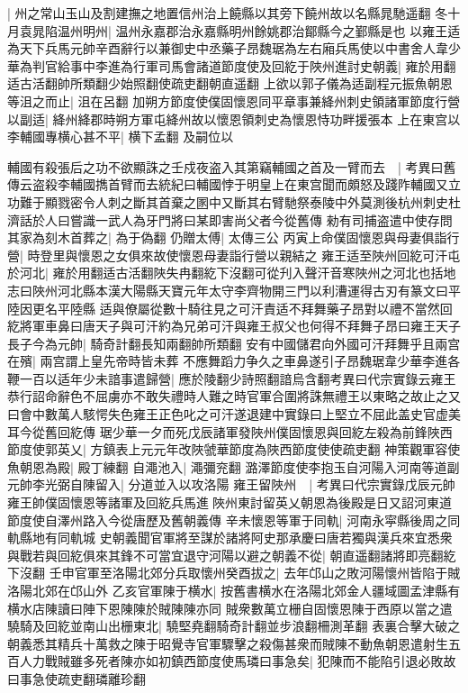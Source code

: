|{
	州之常山玉山及割建撫之地置信州治上饒縣以其旁下饒州故以名縣晁馳遥翻}
冬十月袁晁陷温州明州|{
	温州永嘉郡治永嘉縣明州餘姚郡治鄮縣今之鄞縣是也}
以雍王适為天下兵馬元帥辛酉辭行以兼御史中丞藥子昂魏琚為左右廂兵馬使以中書舍人韋少華為判官給事中李進為行軍司馬會諸道節度使及回紇于陜州進討史朝義|{
	雍於用翻适古活翻帥所類翻少始照翻使疏吏翻朝直遥翻}
上欲以郭子儀為适副程元振魚朝恩等沮之而止|{
	沮在呂翻}
加朔方節度使僕固懷恩同平章事兼絳州刺史領諸軍節度行營以副适|{
	絳州絳郡時朔方軍屯絳州故以懷恩領刺史為懷恩恃功畔援張本}
上在東宫以李輔國專横心甚不平|{
	横下孟翻}
及嗣位以

輔國有殺張后之功不欲顯誅之壬戍夜盗入其第竊輔國之首及一臂而去　|{
	考異曰舊傳云盗殺李輔國擕首臂而去統紀曰輔國悖于明皇上在東宫聞而頗怒及踐阼輔國又立功難于顯戮密令人刺之斷其首棄之圂中又斷其右臂馳祭泰陵中外莫測後杭州刺史杜濟話於人曰嘗識一武人為牙門將曰某即害尚父者今從舊傳}
勑有司捕盗遣中使存問其家為刻木首葬之|{
	為于偽翻}
仍贈太傅|{
	太傳三公}
丙寅上命僕固懷恩與母妻俱詣行營|{
	時登里與懷恩之女俱來故使懷恩母妻詣行營以親結之}
雍王适至陜州回紇可汗屯於河北|{
	雍於用翻适古活翻陜失冉翻紇下沒翻可從刋入聲汗音寒陜州之河北也括地志曰陜州河北縣本漢大陽縣天寶元年太守李齊物開三門以利漕運得古刃有篆文曰平陸因更名平陸縣}
适與僚屬從數十騎往見之可汗責适不拜舞藥子昂對以禮不當然回紇將軍車鼻曰唐天子與可汗約為兄弟可汗與雍王叔父也何得不拜舞子昂曰雍王天子長子今為元帥|{
	騎奇計翻長知兩翻帥所類翻}
安有中國儲君向外國可汗拜舞乎且兩宫在殯|{
	兩宫謂上皇先帝時皆未葬}
不應舞蹈力争久之車鼻遂引子昂魏琚韋少華李進各鞭一百以适年少未諳事遣歸營|{
	應於陵翻少詩照翻諳烏含翻考異曰代宗實錄云雍王恭行詔命辭色不屈虜亦不敢失禮時人難之時官軍合圍將誅無禮王以東略之故止之又曰會中數萬人駭愕失色雍王正色叱之可汗遂退建中實錄曰上堅立不屈此盖史官虚美耳今從舊回紇傳}
琚少華一夕而死戊辰諸軍發陜州僕固懷恩與回紇左殺為前鋒陜西節度使郭英乂|{
	方鎮表上元元年改陜虢華節度為陜西節度使使疏吏翻}
神策觀軍容使魚朝恩為殿|{
	殿丁練翻}
自澠池入|{
	澠彌兖翻}
潞澤節度使李抱玉自河陽入河南等道副元帥李光弼自陳留入|{
	分道並入以攻洛陽}
雍王留陜州　|{
	考異曰代宗實錄戊辰元帥雍王帥僕固懷恩等諸軍及回紇兵馬進陜州東討留英乂朝恩為後殿是日又詔河東道節度使自澤州路入今從唐歷及舊朝義傳}
辛未懷恩等軍于同軌|{
	河南永寜縣後周之同軌縣地有同軌城}
史朝義聞官軍將至謀於諸將阿史那承慶曰唐若獨與漢兵來宜悉衆與戰若與回紇俱來其鋒不可當宜退守河陽以避之朝義不從|{
	朝直遥翻諸將即亮翻紇下沒翻}
壬申官軍至洛陽北郊分兵取懷州癸酉拔之|{
	去年邙山之敗河陽懷州皆陷于賊洛陽北郊在邙山外}
乙亥官軍陳于横水|{
	按舊書横水在洛陽北郊金人疆域圖孟津縣有横水店陳讀曰陣下恩陳陳於賊陳陳亦同}
賊衆數萬立栅自固懷恩陳于西原以當之遣驍騎及回紇並南山出栅東北|{
	驍堅堯翻騎奇計翻並步浪翻柵測革翻}
表裏合擊大破之朝義悉其精兵十萬救之陳于昭覺寺官軍驟擊之殺傷甚衆而賊陳不動魚朝恩遣射生五百人力戰賊雖多死者陳亦如初鎮西節度使馬璘曰事急矣|{
	犯陳而不能陷引退必敗故曰事急使疏吏翻璘離珍翻}
